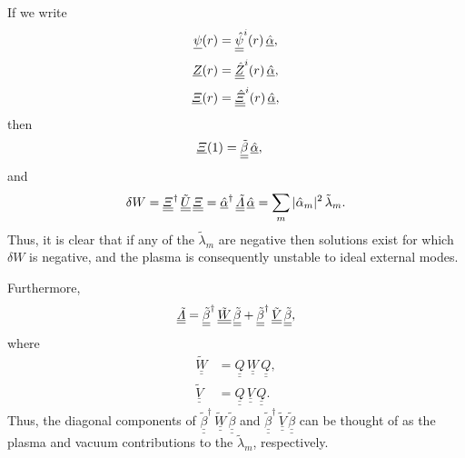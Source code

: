 \documentclass[12pt,prb,aps,notitlepage]{revtex4-1}
\begin{document}
If we write
\begin{align}
\underline{\psi}(r)&= \underline{\underline{\hat{\psi}}}^i(r)\,\underline{\hat{\alpha}},\\[0.5ex]
\underline{Z}(r)&= \underline{\underline{\hat{Z}}}^i(r)\,\underline{\hat{\alpha}},\\[0.5ex]
\underline{{\mit\Xi}}(r)&= \underline{\underline{\hat{\mit\Xi}}}^i(r)\,\underline{\hat{\alpha}},
\end{align}
then
\begin{align}
\underline{{\mit\Xi}}(1) &=\underline{\underline{\tilde{\beta}}}\,\underline{\hat{\alpha}},
\end{align}
and 
\begin{equation}
 \delta W= \underline{\underline{\mit\Xi}}^\dag\,\underline{\underline{\tilde{U}}}\,\underline{\underline{{\mit\Xi}}}=\underline{\hat{\alpha}}^\dag\,\underline{\underline{\tilde{\mit\Lambda}}}\,\underline{\hat{\alpha}}= \sum_m |\hat{\alpha}_m|^2\,\tilde{\lambda}_m.
 \end{equation}
Thus, it is clear that if any of the $\tilde{\lambda}_m$ are negative then solutions exist for which $\delta W$ is negative, and the plasma
is consequently unstable to ideal external modes. 

 Furthermore,
\begin{equation}
\underline{\underline{\tilde{\mit\Lambda}}}=\underline{\underline{\tilde{\beta}}}^\dag\,\underline{\underline{\tilde{W}}}\,\underline{\underline{\tilde{\beta}}}
+\underline{\underline{\tilde{\beta}}}^\dag\,\underline{\underline{\tilde{V}}}\,\underline{\underline{\tilde{\beta}}},
\end{equation}
where
\begin{align}
\underline{\underline{\tilde{W}}}&= \underline{\underline{Q}}\,\underline{\underline{W}}\,\underline{\underline{Q}},\\[0.5ex]
\underline{\underline{\tilde{V}}}&= \underline{\underline{Q}}\,\underline{\underline{V}}\,\underline{\underline{Q}}.
\end{align}
Thus, the diagonal components of $\underline{\underline{\tilde{\beta}}}^\dag\,\underline{\underline{\tilde{W}}}\,\underline{\underline{\tilde{\beta}}}$ and 
$\underline{\underline{\tilde{\beta}}}^\dag\,\underline{\underline{\tilde{V}}}\,\underline{\underline{\tilde{\beta}}}$ can be thought of as the
plasma and vacuum contributions to the $\tilde{\lambda}_m$, respectively. 
\end{document}
